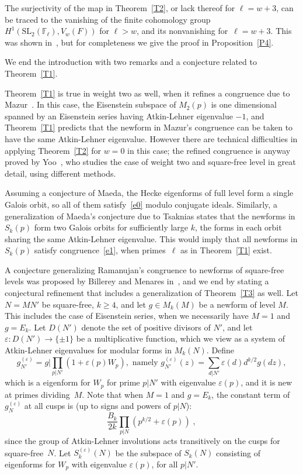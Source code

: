 \documentclass{amsart}
\theoremstyle{plain}
\theoremstyle{definition}
\numberwithin{equation}{section}
\def\SL{\mathrm{SL}} \def\PSL{\mathrm{PSL}}\def\GL{\mathrm{GL}}\def\PGL{\mathrm{PGL}}
\def\e{\varepsilon} \def\DD{\Delta} \def\G{\Gamma}\def\om{\omega}
\def\be{\begin{equation}}  \def\ee{\end{equation}}
\def\rar{\rightarrow}\def\FF{\mathbb{F}}
\begin{document}
The surjectivity of the map in Theorem~\ref{T2}, or lack thereof for $\ell= w+3$, 
can be traced to the vanishing of the finite cohomology group 
$H^1(\SL_2(\FF_\ell), V_w(F))$ for $\ell>w$, and its nonvanishing for~$\ell=w+3$. 
This was shown in~\cite{KPS}, but for completeness we give the proof in 
Proposition~\ref{P4}. 

We end the introduction with two remarks and a conjecture related to 
Theorem~\ref{T1}. 

Theorem~\ref{T1} is true in weight two as well, when it refines a congruence 
due to Mazur~\cite[Prop. 5.12]{Mz}. In this case, the Eisenstein subspace of $M_2(p)$ is 
one dimensional spanned by an Eisenstein series having Atkin-Lehner eigenvalue $-1$, and 
Theorem~\ref{T1} predicts that the newform in Mazur's congruence 
can be taken to have the same Atkin-Lehner eigenvalue. However there are technical 
difficulties in applying Theorem~\ref{T2} for $w=0$ in this case; 
the refined congruence is anyway proved by  Yoo~\cite[Thm. 1.3 (i)]{Yo}, who studies  
the case of weight two and square-free level in great detail, using different methods.  

Assuming a conjecture of Maeda, the Hecke eigenforms of full level form a 
single Galois orbit, so all of them satisfy~\eqref{e0} 
modulo conjugate ideals. Similarly, a generalization of 
Maeda's conjecture due to Tsaknias \cite{Ts} states that the newforms in 
$S_k(p)$ form two Galois orbits for sufficiently large $k$, 
the forms in each orbit sharing the same Atkin-Lehner eigenvalue. 
This would imply that all newforms in $S_k(p)$ satisfy congruence~\eqref{e1}, 
when primes~$\ell$ as in Theorem~\ref{T1} exist. 

A conjecture generalizing Ramanujan's congruence to newforms of 
square-free levels was proposed by Billerey and Menares in~\cite{BM}, 
and we end by stating a conjectural refinement that includes a generalization 
of Theorem~\ref{T3} as well. Let $N=M N'$ be 
square-free, $k\ge 4$, and let $g\in M_k(M)$ be a newform of level $M$. 
This includes the case of Eisenstein series, when we necessarily 
have $M=1$ and $g=E_k$. Let
$D(N')$ denote the set of positive divisors of $N'$, and let $\e:D(N')\rar\{\pm 1\}$ 
be a  multiplicative function, which we view as a system of Atkin-Lehner eigenvalues
for modular forms in $M_k(N)$. Define 
\[g_{N'}^{(\e)}=g| \prod_{p|N'} (1+\e(p) W_p), \text{ namely } 
g_{N'}^{(\e)}(z)=\sum_{d|N'}\e(d)d^{k/2} g(dz),
\]
which is a eigenform for $W_p$ for prime $p|N'$ with eigenvalue $\e(p)$, and 
it is new at primes dividing~$M$. Note that when $M=1$ and $g=E_k$, 
the constant term of $g_{N}^{(\e)}$ at all cusps is 
(up to signs and powers of $p|N$):
\be\label{1.7} \frac{B_k}{2k}\prod_{p|N}(p^{k/2}+\e(p))\;, \ee 
since the group of Atkin-Lehner involutions acts transitively on the cusps for square-free~$N$. 
Let $S_k^{(\e)}(N)$ be the subspace of $S_k(N)$ 
consisting of eigenforms for $W_p$ with eigenvalue $\e(p)$, for all $p|N'$. 
\end{document}
